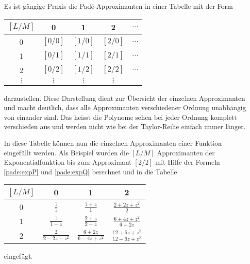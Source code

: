 Es ist gängige Praxis die Padé-Approximanten in einer Tabelle mit der Form
\begin{center}
	\begin{tabular}{c| c c c c}
		
		$[L/M]$ 	& 0 		& 1 		& 2 		& $\cdots$ \\
		\hline
		0 		& $[0/0]$ 	& $[1/0]$ 	& $[2/0]$ 	& $\dots$ \\
		1 		& $[0/1]$ 	& $[1/1]$ 	& $[2/1]$ 	& $\dots$ \\
		2 		& $[0/2]$ 	& $[1/2]$ 	& $[2/2]$ 	& $\dots$ \\
		$\vdots$ 	& $\vdots$ 	& $\vdots$  	& $\vdots$  	&  \\
	\end{tabular}
\end{center}
darzustellen.
Diese Darstellung dient zur Übersicht der einzelnen Approximanten und macht deutlich, dass alle Approximanten verschiedener Ordnung unabhängig von einander sind. 
Das heisst die Polynome sehen bei jeder Ordnung komplett verschieden aus und werden nicht wie bei der Taylor-Reihe einfach immer länger. 


In diese Tabelle können nun die einzelnen Approximanten einer Funktion eingefüllt werden.
Als Beispiel wurden die $[L/M]$ Approximanten der Exponentialfunktion
bis zum Approximant $[2/2]$
mit Hilfe der Formeln \ref{pade:expP} und \ref{pade:expQ} berechnet und
in die Tabelle
\begin{center}
\renewcommand\arraystretch{1.8}
	\begin{tabular}{c| c c c }
		$[L/M]$ 	& 0 		& 1 		& 2 	 \\
		\hline
		0 		&  $\displaystyle\frac{1}{1}$ 	& $\displaystyle\frac{1+z}{1}$ 	& $\displaystyle\frac{2+2 z+z^{2}}{2}$ \\
		1 		& $\displaystyle \frac{1}{1-z}$ 	& $\displaystyle\frac{2+z}{2-z}$ 	& $\displaystyle\frac{6+4 z+z^{2}}{6-2 z}$ 	 \\
		2 		& $\displaystyle\frac{2}{2-2 z+z^{2}} $ 	& $\displaystyle\frac{6+2 z}{6-4 z+z^{2}}$ 	& $\displaystyle\frac{12+6 z+z^{2}}{12-6 z+z^{2}}$ 	 \\
	\end{tabular}
\end{center}
eingefügt.













